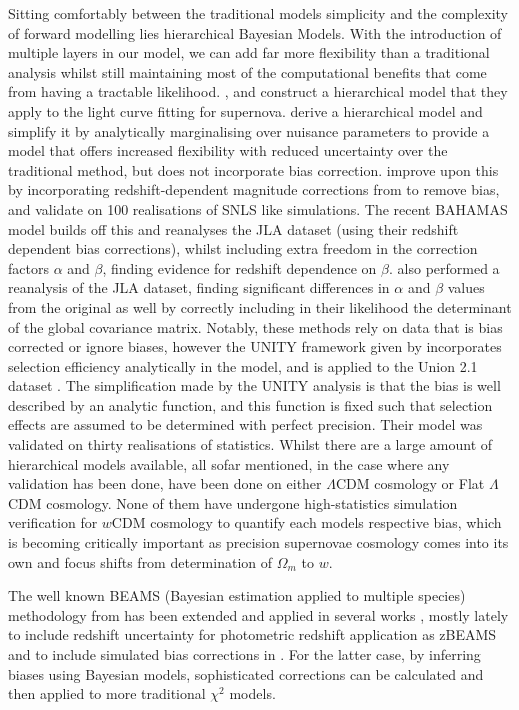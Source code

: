 \documentclass[a4paper,fleqn,usenatbib]{mnras}
\begin{document}
Sitting comfortably between the traditional models simplicity and the complexity of forward modelling lies hierarchical Bayesian Models. With the introduction of multiple layers in our model, we can add far more flexibility than a traditional analysis whilst still maintaining most of the computational benefits that come from having a tractable likelihood. \citet{Mandel2009}, \citet{Mandel2011} and \citet{Mandel2017} construct a hierarchical model that they apply to the light curve fitting for supernova. \citet{March2011} derive a hierarchical model and simplify it by analytically marginalising over nuisance parameters to provide a model that offers increased flexibility with reduced uncertainty over the traditional method, but does not incorporate bias correction. \citet{March2014, Karpenka2015} improve upon this by incorporating redshift-dependent magnitude corrections from \citet{Perrett2010} to remove bias, and validate on 100 realisations of SNLS like simulations. The recent BAHAMAS model \citep{Shariff2016} builds off this and reanalyses the JLA dataset (using their redshift dependent bias corrections), whilst including extra freedom in the correction factors $\alpha$ and $\beta$, finding evidence for redshift dependence on $\beta$. \citet{Ma2016} also performed a reanalysis of the JLA dataset, finding significant differences in $\alpha$ and $\beta$ values from the original as well by correctly including in their likelihood the determinant of the global covariance matrix. Notably, these methods rely on data that is bias corrected or ignore biases, however the UNITY framework given by \citet{Rubin2015} incorporates selection efficiency analytically in the model, and is applied to the Union 2.1 dataset \citep{Suzuki2012}. The simplification made by the UNITY analysis is that the bias is well described by an analytic function, and this function is fixed such that selection effects are assumed to be determined with perfect precision. Their model was validated on thirty realisations of statistics. Whilst there are a large amount of hierarchical models available, all sofar mentioned, in the case where any validation has been done, have been done on either $\Lambda$CDM cosmology or Flat $\Lambda$CDM cosmology. None of them have undergone high-statistics simulation verification for $w$CDM cosmology to quantify each models respective bias, which is becoming critically important as precision supernovae cosmology comes into its own and focus shifts from determination of $\Omega_m$ to $w$.

The well known BEAMS (Bayesian estimation applied to multiple species) methodology from \citet{Kunz2007} has been extended and applied in several works \citep{Hlozek2012}, mostly lately to include redshift uncertainty for photometric redshift application as zBEAMS \citep{Roberts2017} and to include simulated bias corrections in \citet{Kessler2017}. For the latter case, by inferring biases using Bayesian models, sophisticated corrections can be calculated and then applied to more traditional $\chi^2$ models.
\end{document}
